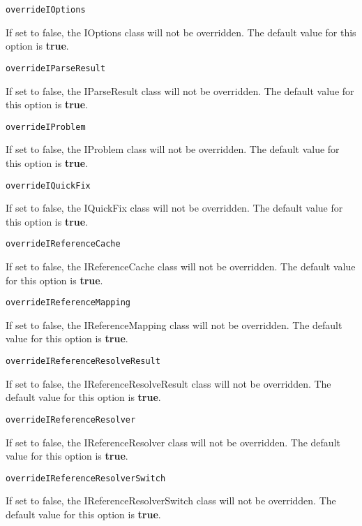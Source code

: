 \noindent\texttt{overrideIOptions}
\begin{myindentpar}{1cm}
If set to false, the IOptions class will not be overridden. The default value for this option is \textbf{true}.
\end{myindentpar}

\noindent\texttt{overrideIParseResult}
\begin{myindentpar}{1cm}
If set to false, the IParseResult class will not be overridden. The default value for this option is \textbf{true}.
\end{myindentpar}

\noindent\texttt{overrideIProblem}
\begin{myindentpar}{1cm}
If set to false, the IProblem class will not be overridden. The default value for this option is \textbf{true}.
\end{myindentpar}

\noindent\texttt{overrideIQuickFix}
\begin{myindentpar}{1cm}
If set to false, the IQuickFix class will not be overridden. The default value for this option is \textbf{true}.
\end{myindentpar}

\noindent\texttt{overrideIReferenceCache}
\begin{myindentpar}{1cm}
If set to false, the IReferenceCache class will not be overridden. The default value for this option is \textbf{true}.
\end{myindentpar}

\noindent\texttt{overrideIReferenceMapping}
\begin{myindentpar}{1cm}
If set to false, the IReferenceMapping class will not be overridden. The default value for this option is \textbf{true}.
\end{myindentpar}

\noindent\texttt{overrideIReferenceResolveResult}
\begin{myindentpar}{1cm}
If set to false, the IReferenceResolveResult class will not be overridden. The default value for this option is \textbf{true}.
\end{myindentpar}

\noindent\texttt{overrideIReferenceResolver}
\begin{myindentpar}{1cm}
If set to false, the IReferenceResolver class will not be overridden. The default value for this option is \textbf{true}.
\end{myindentpar}

\noindent\texttt{overrideIReferenceResolverSwitch}
\begin{myindentpar}{1cm}
If set to false, the IReferenceResolverSwitch class will not be overridden. The default value for this option is \textbf{true}.
\end{myindentpar}

